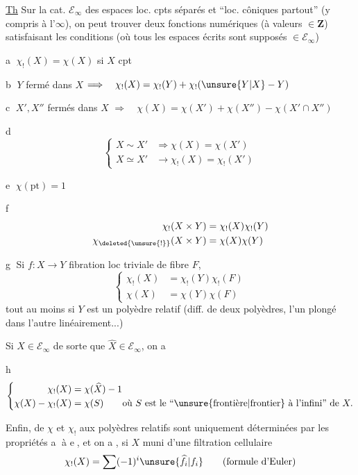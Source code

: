 
\uline{Th} Sur la cat. $\mathcal E_\infty$ des espaces loc. cpts séparés et  ``loc. côniques partout'' (y compris à l'$\infty$), on peut trouver deux fonctions numériques \inserted{$\chi_!,\chi$} (à valeurs $\in\mathbf Z$) satisfaisant les conditions (où tous les espaces écrits sont supposés $\in\mathcal E_\infty$)

\textcircled{a} $\chi_!(X)=\chi(X)$ si $X$ cpt

\textcircled{b} $Y$ fermé dans $X$ $\Longrightarrow\quad\chi_!(X)=\chi_!(Y)+\chi_!(\unsure{Y|X}-Y)$

\textcircled{c} $X',X''$ fermés dans $X$ $\Longrightarrow\quad\chi(X)=\chi(X')+\chi(X'')-\chi(X'\cap X'')$

\textcircled{d}
\[
\left\{\begin{aligned}
X\sim X'&\Longrightarrow\chi(X)=\chi(X')\\
X\simeq X'&\longrightarrow\chi_!(X)=\chi_!(X')
\end{aligned}\right.
\]

\textcircled{e} $\chi(\mathrm{pt})=1$

\textcircled{f}
\[
\begin{aligned}
\chi_!(X\times Y)&=\chi_!(X)\chi_!(Y)\\
\chi_{\deleted{\unsure{!}}}(X\times Y)&=\chi(X)\chi(Y)
\end{aligned}
\]

\textcircled{g} Si $f:X\longrightarrow Y$ fibration loc triviale de fibre $F$,
\[
\left\{\begin{aligned}
\chi_!(X)&=\chi_!(Y)\chi_!(F)\\
\chi(X)&=\chi(Y)\chi(F)
\end{aligned}\right.
\]
tout au moins si $Y$ est un polyèdre relatif (diff. de deux polyèdres, l'un plongé dans l'autre linéairement...)

Si  $X\in\mathcal E_\infty$ de sorte que $\widehat X\in\mathcal E_\infty$, on a

\textcircled{h}
\[
\left\{\begin{aligned}
\chi_!(X)&=\chi(\widehat X)-1\\
\chi(X)-\chi_!(X)&=\chi(S)\qquad\text{où }S\text{ est le ``}\unsure{\text{frontière}|\text{frontier}}\text{ à l'infini'' de }X.
\end{aligned}\right.
\]

Enfin,  de  $\chi$ et $\chi_!$ aux polyèdres relatifs sont uniquement déterminées par les propriétés \textcircled{a} à \textcircled{e}, et on a , si $X$ muni d'une filtration cellulaire
\[
\chi_!(X)=\sum(-1)^i\unsure{\widehat f_i|f_i}\qquad\text{(formule d'Euler)}
\]

